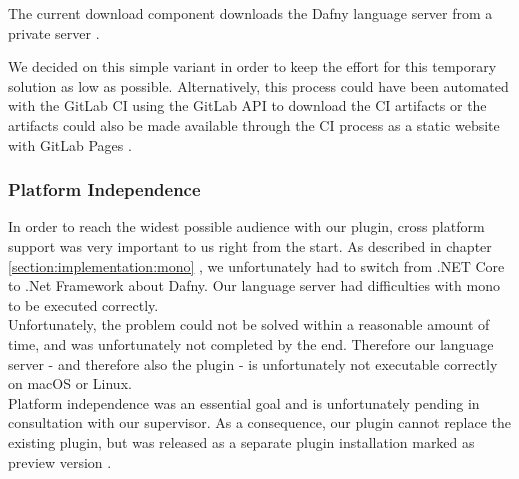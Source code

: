 The current download component downloads the Dafny language server from a private server \cite{client-serverStringResources}.

We decided on this simple variant in order to keep the effort for this temporary solution as low as possible.
Alternatively, this process could have been automated with the GitLab CI using the GitLab API \cite{gitlab-api} to download the CI artifacts
or the artifacts could also be made available through the CI process as a static website with GitLab Pages \cite{gitlab-pages}.

\subsubsection{Platform Independence}
In order to reach the widest possible audience with our plugin,
cross platform support was very important to us right from the start.
As described in chapter \ref{section:implementation:mono} ,
we unfortunately had to switch from .NET Core to .Net Framework
about Dafny. Our language server had difficulties with mono to be executed correctly. \\

Unfortunately, the problem could not be solved within a reasonable amount of time,
and was unfortunately not completed by the end.
Therefore our language server - and therefore also the plugin - is
unfortunately not executable correctly on macOS or Linux. \\

Platform independence was an essential goal and is unfortunately pending in consultation with our supervisor.
As a consequence, our plugin cannot replace the existing plugin,
but was released as a separate plugin installation marked as preview version \cite{our-dafny-plugin}.
